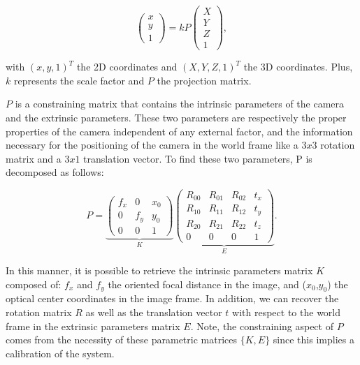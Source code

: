 \begin{equation}
	\begin{pmatrix}
	x \\ y \\ 1
	\end{pmatrix} = kP \begin{pmatrix}
	X \\ Y \\ Z \\ 1
	\end{pmatrix},
\end{equation}

with $(x,y,1)^T$ the 2D coordinates and $(X,Y,Z,1)^T$ the 3D coordinates. Plus, $k$ represents the scale factor and $P$ the projection matrix.

$P$ is a constraining matrix that contains the intrinsic parameters of the camera and the extrinsic parameters. 
These two parameters are respectively the proper properties of the camera independent of any external factor, and the information necessary for the positioning of the camera in the world frame like a $3x3$ rotation matrix and a $3x1$ translation vector.
To find these two parameters, P is decomposed as follows:

\begin{equation}
	P = \underbrace{\begin{pmatrix}
	f_x & 0 & x_0 \\
	0 & f_y & y_0 \\
	0 & 0 & 1
	\end{pmatrix}}_K \underbrace{\begin{pmatrix}
	R_{00} & R_{01} & R_{02} & t_x \\
	R_{10} & R_{11} & R_{12} & t_y \\
	R_{20} & R_{21} & R_{22} & t_z \\
	0 & 0 & 0 & 1
	\end{pmatrix}}_E.
\end{equation}

In this manner, it is possible to retrieve the intrinsic parameters matrix $K$ composed of: $f_x$ and $f_y$ the oriented focal distance in the image, and ($x_0$,$y_0$) the optical center coordinates in the image frame. In addition, we can recover the rotation matrix $R$ as well as the translation vector $t$ with respect to the world frame in the extrinsic parameters matrix $E$. Note, the constraining aspect of $P$ comes from the necessity of these parametric matrices $\{K,E\}$ since this implies a calibration of the system.

